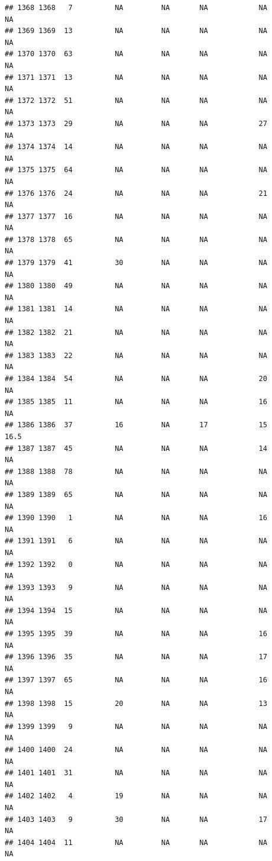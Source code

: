 \documentclass[man]{apa6}
\begin{document}
\begin{verbatim}
## 1368 1368   7          NA         NA       NA            NA       NA
## 1369 1369  13          NA         NA       NA            NA       NA
## 1370 1370  63          NA         NA       NA            NA       NA
## 1371 1371  13          NA         NA       NA            NA       NA
## 1372 1372  51          NA         NA       NA            NA       NA
## 1373 1373  29          NA         NA       NA            27       NA
## 1374 1374  14          NA         NA       NA            NA       NA
## 1375 1375  64          NA         NA       NA            NA       NA
## 1376 1376  24          NA         NA       NA            21       NA
## 1377 1377  16          NA         NA       NA            NA       NA
## 1378 1378  65          NA         NA       NA            NA       NA
## 1379 1379  41          30         NA       NA            NA       NA
## 1380 1380  49          NA         NA       NA            NA       NA
## 1381 1381  14          NA         NA       NA            NA       NA
## 1382 1382  21          NA         NA       NA            NA       NA
## 1383 1383  22          NA         NA       NA            NA       NA
## 1384 1384  54          NA         NA       NA            20       NA
## 1385 1385  11          NA         NA       NA            16       NA
## 1386 1386  37          16         NA       17            15     16.5
## 1387 1387  45          NA         NA       NA            14       NA
## 1388 1388  78          NA         NA       NA            NA       NA
## 1389 1389  65          NA         NA       NA            NA       NA
## 1390 1390   1          NA         NA       NA            16       NA
## 1391 1391   6          NA         NA       NA            NA       NA
## 1392 1392   0          NA         NA       NA            NA       NA
## 1393 1393   9          NA         NA       NA            NA       NA
## 1394 1394  15          NA         NA       NA            NA       NA
## 1395 1395  39          NA         NA       NA            16       NA
## 1396 1396  35          NA         NA       NA            17       NA
## 1397 1397  65          NA         NA       NA            16       NA
## 1398 1398  15          20         NA       NA            13       NA
## 1399 1399   9          NA         NA       NA            NA       NA
## 1400 1400  24          NA         NA       NA            NA       NA
## 1401 1401  31          NA         NA       NA            NA       NA
## 1402 1402   4          19         NA       NA            NA       NA
## 1403 1403   9          30         NA       NA            17       NA
## 1404 1404  11          NA         NA       NA            NA       NA

\end{verbatim}
\end{document}
